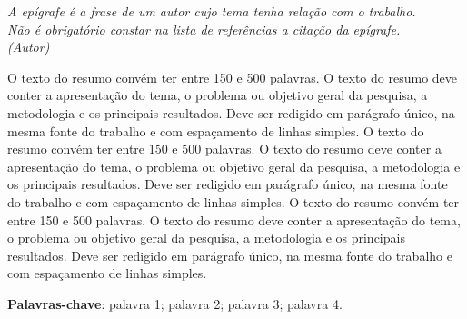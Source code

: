 \begin{epigrafe}
    \vspace*{\fill}
    \begin{flushright}
        \begin{minipage}{8.5cm}
            \raggedleft
            \textit{
                A epígrafe é a frase de um autor cujo tema tenha relação com o trabalho.\\Não é obrigatório constar na lista de referências a citação da epígrafe.\\[\baselineskip]
                (Autor)
            }
        \end{minipage}
    \end{flushright}
\end{epigrafe}


\begin{resumo}
\SingleSpacing

    \noindent O texto do resumo convém ter entre 150 e 500 palavras. O texto do resumo deve conter a apresentação do tema, o problema ou objetivo geral da pesquisa, a metodologia e os principais resultados. Deve ser redigido em parágrafo único, na mesma fonte do trabalho e com espaçamento de linhas simples. O texto do resumo convém ter entre 150 e 500 palavras. O texto do resumo deve conter a apresentação do tema, o problema ou objetivo geral da pesquisa, a metodologia e os principais resultados. Deve ser redigido em parágrafo único, na mesma fonte do trabalho e com espaçamento de linhas simples. O texto do resumo convém ter entre 150 e 500 palavras. O texto do resumo deve conter a apresentação do tema, o problema ou objetivo geral da pesquisa, a metodologia e os principais resultados. Deve ser redigido em parágrafo único, na mesma fonte do trabalho e com espaçamento de linhas simples.
    
    \vspace{\onelineskip}
    
    \noindent
    \textbf{Palavras-chave}: palavra 1; palavra 2; palavra 3; palavra 4.
    
\end{resumo}

